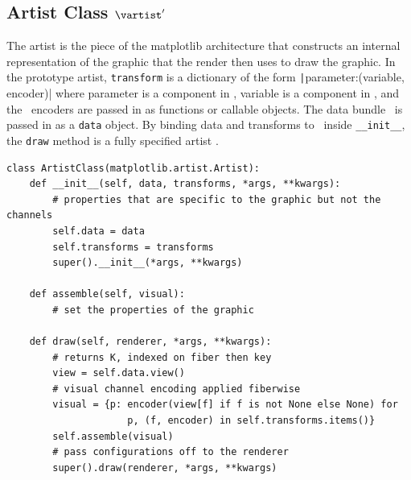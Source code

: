 \documentclass[../main.tex]{subfiles}
\begin{document}
\subsection{Artist Class $\vartist^{\prime}$}
\label{sec:code_artist}
The artist is the piece of the matplotlib architecture that constructs an internal representation of the graphic that the render then uses to draw the graphic. In the prototype artist, \texttt{transform} is a dictionary of the form \texttt|{parameter:(variable, encoder)}| where parameter is a component in \vfiber, variable is a component in \dfiber,  and the \vchannel\ encoders are passed in as functions or callable objects. The data bundle \dtotal\ is passed in as a \texttt{data} object. By binding data and transforms to \vartisteq\ inside \texttt{__init__}, the \texttt{draw} method is a fully specified artist \vartist.

\begin{verbatim}
class ArtistClass(matplotlib.artist.Artist):
    def __init__(self, data, transforms, *args, **kwargs):
        # properties that are specific to the graphic but not the channels
        self.data = data 
        self.transforms = transforms
        super().__init__(*args, **kwargs)

    def assemble(self, visual):
        # set the properties of the graphic

    def draw(self, renderer, *args, **kwargs):
        # returns K, indexed on fiber then key 
        view = self.data.view() 
        # visual channel encoding applied fiberwise 
        visual = {p: encoder(view[f] if f is not None else None) for 
                     p, (f, encoder) in self.transforms.items()}
        self.assemble(visual)
        # pass configurations off to the renderer
        super().draw(renderer, *args, **kwargs)
\end{verbatim}
\end{document}
